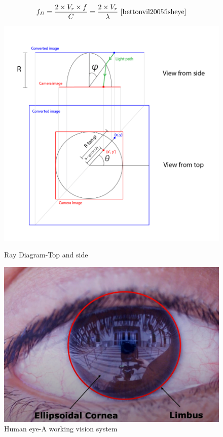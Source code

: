 \documentclass[11pt, a4paper, openany]{book}
\begin{document}
\begin{equation}
f_{D}=\frac{2 \times V_{r} \times f}{C}=\frac{2 \times V_{r}}{\lambda} ~\cite{bettonvil2005fisheye}
\end{equation}
\begin{figure}[H]
  \centering
  \begin{minipage}[b]{0.4\textwidth}
  \begin{center}
    \includegraphics[scale=0.3]{Labbot&ele/6.png}
    \caption{Ray Diagram-Top and side~\cite{bettonvil2005fisheye}}
    \label{fig:ray2} 
      \end{center}
  \end{minipage}
  \hfill
  \begin{minipage}[b]{0.4\textwidth}
  \includegraphics[scale=0.3]{Labbot&ele/7.png}
    \caption{Human eye-A working vision system}
    \label{fig:ray3} 
  \end{minipage}
\end{figure}
\end{document}
